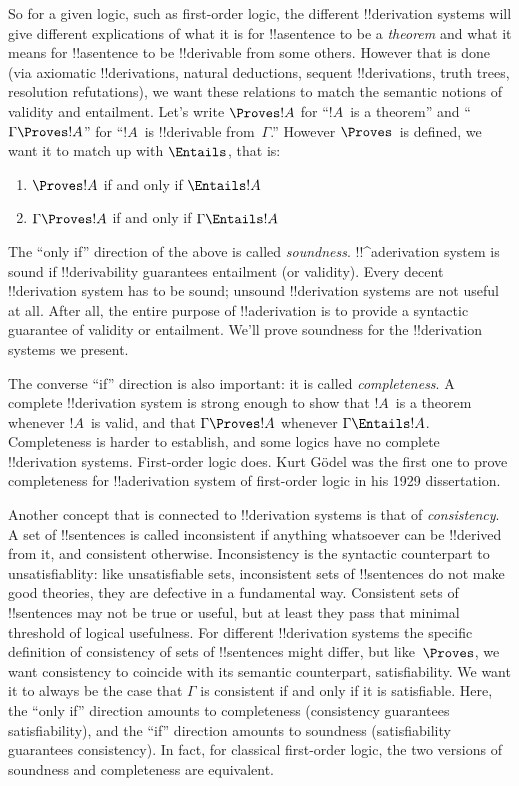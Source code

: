 So for a given logic, such as first-order logic, the different
!!{derivation} systems will give different explications of what it is
for !!a{sentence} to be a \emph{theorem} and what it means for
!!a{sentence} to be !!{derivable} from some others. However that is
done (via axiomatic !!{derivation}s, natural deductions, sequent
!!{derivation}s, truth trees, resolution refutations), we want these
relations to match the semantic notions of validity and
entailment. Let's write $\Proves !A$ for ``$!A$~is a theorem'' and
``$\Gamma \Proves !A$'' for ``$!A$~is !!{derivable} from~$\Gamma$.''
However $\Proves$~is defined, we want it to match up with $\Entails$,
that is:
\begin{enumerate}
\item $\Proves !A$ if and only if $\Entails !A$
\item $\Gamma \Proves !A$ if and only if $\Gamma \Entails !A$
\end{enumerate}
The ``only if'' direction of the above is called
\emph{soundness}. !!^a{derivation} system is sound if !!{derivability}
guarantees entailment (or validity). Every decent !!{derivation}
system has to be sound; unsound !!{derivation} systems are not useful
at all. After all, the entire purpose of !!a{derivation} is to provide
a syntactic guarantee of validity or entailment. We'll prove soundness
for the !!{derivation} systems we present.

The converse ``if'' direction is also important: it is called
\emph{completeness}. A complete !!{derivation} system is strong enough
to show that $!A$~is a theorem whenever $!A$~is valid, and that
$\Gamma \Proves !A$ whenever $\Gamma \Entails !A$.
Completeness is harder to establish, and some logics have no complete
!!{derivation} systems. First-order logic does. Kurt G\"odel was the
first one to prove completeness for !!a{derivation} system of
first-order logic in his 1929 dissertation.

Another concept that is connected to !!{derivation} systems is that of
\emph{consistency}. A set of !!{sentence}s is called inconsistent if
anything whatsoever can be !!{derive}d from it, and consistent
otherwise.  Inconsistency is the syntactic counterpart to
unsatisfiablity: like unsatisfiable sets, inconsistent sets of
!!{sentence}s do not make good theories, they are defective in a
fundamental way. Consistent sets of !!{sentence}s may not be true or
useful, but at least they pass that minimal threshold of logical
usefulness.  For different !!{derivation} systems the specific
definition of consistency of sets of !!{sentence}s might differ, but
like~$\Proves$, we want consistency to coincide with its semantic
counterpart, satisfiability. We want it to always be the case that
$\Gamma$ is consistent if and only if it is satisfiable. Here, the
``only if'' direction amounts to completeness (consistency guarantees
satisfiability), and the ``if'' direction amounts to soundness
(satisfiability guarantees consistency).  In fact, for classical
first-order logic, the two versions of soundness and completeness are
equivalent.





